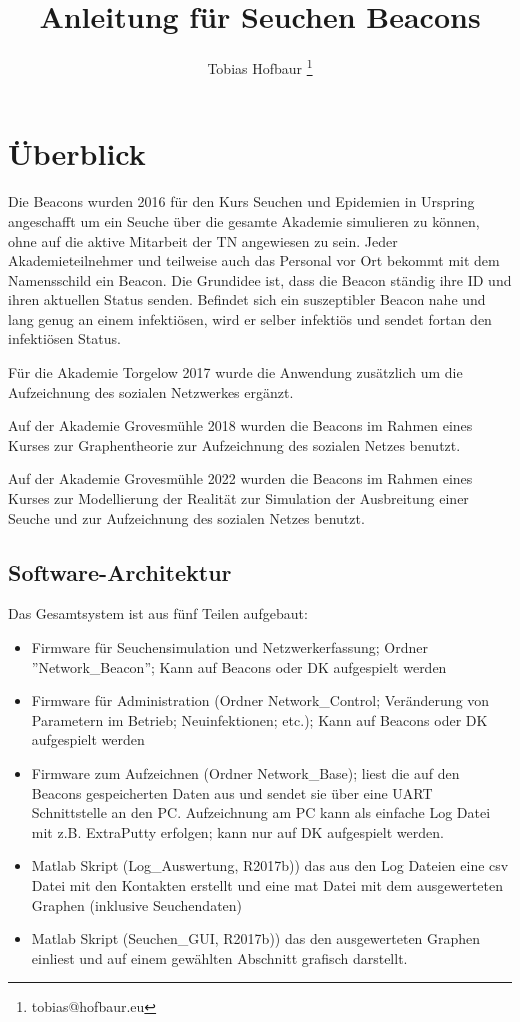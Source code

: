 \documentclass[11pt,ngerman]{scrartcl} %
\title{Anleitung für Seuchen Beacons}
\author{Tobias Hofbaur \footnote{tobias@hofbaur.eu}}
\begin{document}
\maketitle

\section{Überblick}
Die Beacons wurden 2016 für den Kurs Seuchen und Epidemien in Urspring angeschafft um ein Seuche über die gesamte Akademie simulieren zu können, ohne auf die aktive Mitarbeit der TN angewiesen zu sein. 
Jeder Akademieteilnehmer und teilweise auch das Personal vor Ort bekommt mit dem Namensschild ein Beacon. Die Grundidee ist, dass die Beacon ständig ihre ID und ihren aktuellen Status senden. Befindet sich ein suszeptibler Beacon nahe und lang genug an einem infektiösen, wird er selber infektiös und sendet fortan den infektiösen Status.

Für die Akademie Torgelow 2017 wurde die Anwendung zusätzlich um die Aufzeichnung des sozialen Netzwerkes ergänzt.

Auf der Akademie Grovesmühle 2018 wurden die Beacons im Rahmen eines Kurses zur Graphentheorie zur Aufzeichnung des sozialen Netzes benutzt.

Auf der Akademie Grovesmühle 2022 wurden die Beacons im Rahmen eines Kurses zur Modellierung der Realität zur Simulation der Ausbreitung einer Seuche und zur Aufzeichnung des sozialen Netzes benutzt.
\subsection{Software-Architektur}
Das Gesamtsystem ist aus fünf Teilen aufgebaut:
\begin{itemize}
\item Firmware  für Seuchensimulation und Netzwerkerfassung; Ordner ''Network\_Beacon''; Kann auf Beacons oder DK aufgespielt werden
\item Firmware für Administration (Ordner Network\_Control; Veränderung von Parametern im Betrieb; Neuinfektionen; etc.);  Kann auf Beacons oder DK aufgespielt werden
\item Firmware zum Aufzeichnen (Ordner Network\_Base); liest die auf den Beacons gespeicherten Daten aus und sendet sie über eine UART Schnittstelle an den PC. Aufzeichnung am PC kann als einfache Log Datei mit z.B. ExtraPutty erfolgen; kann nur auf DK aufgespielt werden.
\item  Matlab Skript (Log\_Auswertung, R2017b)) das aus den Log Dateien eine csv Datei mit den Kontakten erstellt und eine mat Datei mit dem ausgewerteten Graphen (inklusive Seuchendaten)
\item  Matlab Skript (Seuchen\_GUI, R2017b)) das den ausgewerteten Graphen einliest und auf einem gewählten Abschnitt grafisch darstellt.
\end{itemize}
\end{document}
